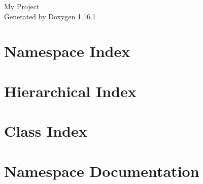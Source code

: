 \documentclass[twoside]{book}
\newcommand{\+}{\discretionary{\mbox{\scriptsize$\hookleftarrow$}}{}{}}
\newcommand{\clearemptydoublepage}{%
    \newpage{\pagestyle{empty}\cleardoublepage}%
  }
\begin{document}
  \raggedbottom
    \hypersetup{pageanchor=false,
                bookmarksnumbered=true,
                pdfencoding=unicode
               }
  \begin{titlepage}
  \vspace*{7cm}
  \begin{center}%
  {\Large My Project}\\
  \vspace*{1cm}
  {\large Generated by Doxygen 1.16.1}\\
  \end{center}
  \end{titlepage}
  \clearemptydoublepage
  \tableofcontents
  \clearemptydoublepage
  \hypersetup{pageanchor=true}

\chapter{Namespace Index}

\chapter{Hierarchical Index}

\chapter{Class Index}

\chapter{Namespace Documentation}

\end{document}
